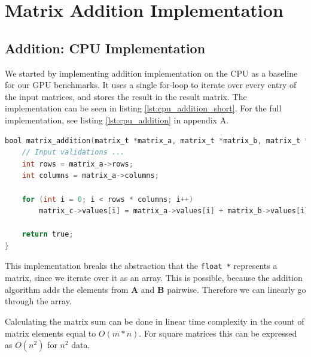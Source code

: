 \section{Matrix Addition Implementation}

\subsection{Addition: CPU Implementation}

We started by implementing addition implementation on the CPU as a baseline for our GPU benchmarks. It uses a single for-loop to iterate over every entry of the input matrices, and stores the result in the result matrix. The implementation can be seen in listing \ref{lst:cpu_addition_short}. For the full implementation, see listing \ref{lst:cpu_addition} in appendix A. 


\begin{lstlisting}[language=C, caption={CPU addition algorithm}, label={lst:cpu_addition_short}]
bool matrix_addition(matrix_t *matrix_a, matrix_t *matrix_b, matrix_t *matrix_c) {
    // Input validations ...
    int rows = matrix_a->rows;
    int columns = matrix_a->columns;

    for (int i = 0; i < rows * columns; i++)
        matrix_c->values[i] = matrix_a->values[i] + matrix_b->values[i];

    return true;
}
\end{lstlisting}

This implementation breaks the abstraction that the \texttt{float *} represents a matrix, since we iterate over it as an array. This is possible, because the addition algorithm adds the elements from $\mathbf{A}$ and $\mathbf{B}$ pairwise. Therefore we can linearly go through the array.

Calculating the matrix sum can be done in linear time complexity in the count of matrix elements equal to $O(m * n)$. For square matrices this can be expressed as $O(n^2)$ for $n^2$ data. 


